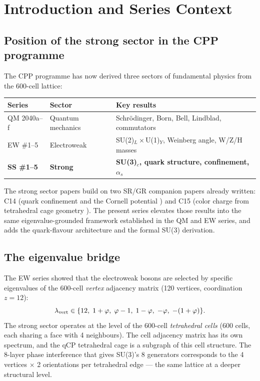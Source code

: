 \documentclass[11pt,a4paper]{article}
\newcommand{\phig}{\varphi}
\begin{document}
\section{Introduction and Series Context}

\subsection{Position of the strong sector in the CPP programme}

The CPP programme has now derived three sectors of fundamental
physics from the 600-cell lattice:

\begin{center}
\begin{tabular}{@{}lll@{}}
\toprule
Series & Sector & Key results \\
\midrule
QM 2040a--f & Quantum mechanics & Schrödinger, Born, Bell, Lindblad,
  commutators \\
EW \#1--5 & Electroweak & SU(2)$_L\times$U(1)$_Y$, Weinberg angle,
  W/Z/H masses \\
\textbf{SS \#1--5} & \textbf{Strong} & \textbf{SU(3)$_c$, quark
  structure, confinement, $\alpha_s$} \\
\bottomrule
\end{tabular}
\end{center}

The strong sector papers build on two SR/GR companion papers already
written: C14 (quark confinement and the Cornell potential
\citep{c14}) and C15 (color charge from tetrahedral cage geometry
\citep{c15}).  The present series elevates those results into the
same eigenvalue-grounded framework established in the QM and EW
series, and adds the quark-flavour architecture and the formal
SU(3) derivation.

\subsection{The eigenvalue bridge}

The EW series showed that the electroweak bosons are selected by
specific eigenvalues of the 600-cell \emph{vertex} adjacency matrix
(120 vertices, coordination $z=12$):
\[
\lambda_{\rm vert} \in \{12,\;1+\phig,\;\phig-1,\;1-\phig,\;-\phig,\;-(1+\phig)\}.
\]
The strong sector operates at the level of the 600-cell
\emph{tetrahedral cells} (600 cells, each sharing a face with 4
neighbours).  The cell adjacency matrix has its own spectrum, and
the qCP tetrahedral cage is a subgraph of this cell structure.
The 8-layer phase interference that gives SU(3)'s 8 generators
corresponds to the 4 vertices $\times$ 2 orientations per
tetrahedral edge --- the same lattice at a deeper structural level.
\end{document}
